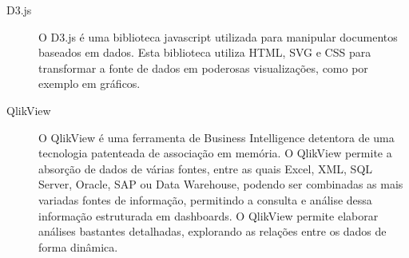 \begin{description}
  \item[D3.js] O D3.js é uma biblioteca javascript utilizada para manipular documentos baseados em dados. Esta biblioteca utiliza HTML, SVG e CSS para transformar a fonte de dados em poderosas visualizações, como por exemplo em gráficos.
  \item[QlikView] O QlikView é uma ferramenta de Business Intelligence detentora de uma tecnologia patenteada de associação em memória. O QlikView permite a absorção de dados de várias fontes, entre as quais Excel, XML, SQL Server, Oracle, SAP ou Data Warehouse, podendo ser combinadas as mais variadas fontes de informação, permitindo a consulta e análise dessa informação estruturada em dashboards. O QlikView permite elaborar análises bastantes detalhadas, explorando as relações entre os dados de forma dinâmica.
\end{description}

